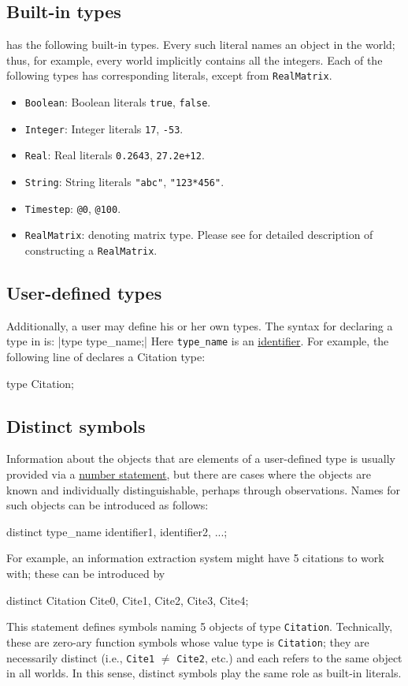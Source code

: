 \documentclass[12pt]{article}
\begin{document}
\subsection{Built-in types}\label{builtin-type-section}
\bl has the following built-in types. 
Every such literal names an object in the world; thus, for example, every world implicitly contains all the integers.
Each of the following types has corresponding literals, except from \verb|RealMatrix|. 
\begin{itemize}
\item \verb|Boolean|: Boolean literals \verb|true|, \verb|false|.
\item \verb|Integer|: Integer literals \verb|17|, \verb|-53|.
\item \verb|Real|: Real literals \verb|0.2643|, \verb|27.2e+12|.
\item \verb|String|: String literals \verb|"abc"|, \verb|"123*456"|.
\item \verb|Timestep|: \verb|@0|, \verb|@100|. 
\item \verb|RealMatrix|: denoting matrix type. Please see  for detailed description of constructing a \verb|RealMatrix|.
\end{itemize}

\subsection{User-defined types}\label{user-type-section}

Additionally, a user may define his or her own types.  The syntax for declaring a type in \bl is:
\blog|type type_name;|
Here \verb|type_name| is an \hyperref[identifier-section]{identifier}. 
For example, the following line of \bl declares a Citation type:
\begin{blogcode}
type Citation;
\end{blogcode}

\subsection{Distinct symbols} \label{distinct-section}
Information about the objects that are elements of a user-defined type
is usually provided via a \hyperref[number-section]{number statement}, but there are cases
where the objects are known and individually distinguishable, perhaps through observations.
Names for such objects can be introduced as follows:
\begin{blogcode}
distinct type_name identifier1, identifier2, ...;
\end{blogcode}
For example, an information extraction system might have 5 citations to work with;
these can be introduced by
\begin{blogcode}
distinct Citation Cite0, Cite1, Cite2, Cite3, Cite4;
\end{blogcode}
This statement defines symbols naming 5 objects of type {\tt Citation}.
Technically, these are zero-ary function symbols whose value type is {\tt Citation};
they are necessarily distinct  (i.e., {\tt Cite1} $\neq$ {\tt Cite2}, etc.)
and each refers to the same object in all worlds. In this sense,
distinct symbols play the same role as built-in literals.
\end{document}
